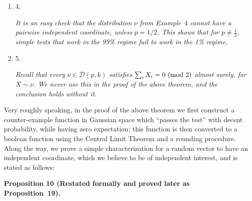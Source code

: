 \documentclass[10pt,a4paper]{article}
\begin{document}
\begin{enumerate}
\emph{for distributions }$\nu\in\mathcal{D}(p,4)$\emph{ with full even-weight support, and }$g_{1},\dots,g_{4}:\left\{0,1\right\}^{n}\to\mathop{\mathbb{R}}$\emph{ bounded, noise stable, and resilient functions.}\par





\item[] 
4. 


\emph{It is an easy check that the distribution }$\nu$\emph{ from Example }4\emph{ cannot have a pairwise independent coordinate, unless }$p=1/2$\emph{. This shows that for }$p\not=\frac{1}{2}$\emph{, simple tests that work in the 99\% regime fail to work in the 1\% regime.}\par





\item[] 
5. 


\emph{Recall that every }$\nu\in\mathcal{D}(p,k)$\emph{ satisfies }$\sum_{i}X_{i}=0\textnormal{ (mod 2)}$\emph{ almost surely, for }$X\sim\nu$\emph{. We never use this in the proof of the above theorem, and the conclusion holds without it.}\par





\end{enumerate}






Very roughly speaking, in the proof of the above theorem we first construct a counter-example function in Gaussian space which “passes the test” with decent probability, while having zero expectation; this function is then converted to a boolean function using the Central Limit Theorem and a rounding procedure.
Along the way, we prove a simple characterization for a random vector to have an independent coordinate, which we believe to be of independent interest, and is stated as follows:\par





\par\medskip\noindent\textbf{
\textbf{Proposition 10}\textbf{ }(Restated formally and proved later as Proposition 19)\textbf{.}
}\par
\end{document}
